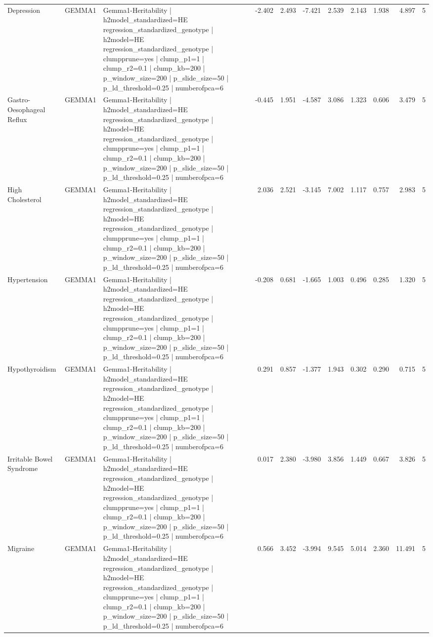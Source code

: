 \begin{landscape}
\begin{longtable}{p{2.4cm}p{1.8cm}p{6.0cm}rrrrrrrr}
Depression & GEMMA1 & Gemma1-Heritability | h2model\_standardized=HE regression\_standardized\_genotype | h2model=HE regression\_standardized\_genotype | clumpprune=yes | clump\_p1=1 | clump\_r2=0.1 | clump\_kb=200 | p\_window\_size=200 | p\_slide\_size=50 | p\_ld\_threshold=0.25 | numberofpca=6 & -2.402 & 2.493 & -7.421 & 2.539 & 2.143 & 1.938 & 4.897 & 5 \\
Gastro-Oesophageal Reflux & GEMMA1 & Gemma1-Heritability | h2model\_standardized=HE regression\_standardized\_genotype | h2model=HE regression\_standardized\_genotype | clumpprune=yes | clump\_p1=1 | clump\_r2=0.1 | clump\_kb=200 | p\_window\_size=200 | p\_slide\_size=50 | p\_ld\_threshold=0.25 | numberofpca=6 & -0.445 & 1.951 & -4.587 & 3.086 & 1.323 & 0.606 & 3.479 & 5 \\
High Cholesterol & GEMMA1 & Gemma1-Heritability | h2model\_standardized=HE regression\_standardized\_genotype | h2model=HE regression\_standardized\_genotype | clumpprune=yes | clump\_p1=1 | clump\_r2=0.1 | clump\_kb=200 | p\_window\_size=200 | p\_slide\_size=50 | p\_ld\_threshold=0.25 | numberofpca=6 & 2.036 & 2.521 & -3.145 & 7.002 & 1.117 & 0.757 & 2.983 & 5 \\
Hypertension & GEMMA1 & Gemma1-Heritability | h2model\_standardized=HE regression\_standardized\_genotype | h2model=HE regression\_standardized\_genotype | clumpprune=yes | clump\_p1=1 | clump\_r2=0.1 | clump\_kb=200 | p\_window\_size=200 | p\_slide\_size=50 | p\_ld\_threshold=0.25 | numberofpca=6 & -0.208 & 0.681 & -1.665 & 1.003 & 0.496 & 0.285 & 1.320 & 5 \\
Hypothyroidism & GEMMA1 & Gemma1-Heritability | h2model\_standardized=HE regression\_standardized\_genotype | h2model=HE regression\_standardized\_genotype | clumpprune=yes | clump\_p1=1 | clump\_r2=0.1 | clump\_kb=200 | p\_window\_size=200 | p\_slide\_size=50 | p\_ld\_threshold=0.25 | numberofpca=6 & 0.291 & 0.857 & -1.377 & 1.943 & 0.302 & 0.290 & 0.715 & 5 \\
Irritable Bowel Syndrome & GEMMA1 & Gemma1-Heritability | h2model\_standardized=HE regression\_standardized\_genotype | h2model=HE regression\_standardized\_genotype | clumpprune=yes | clump\_p1=1 | clump\_r2=0.1 | clump\_kb=200 | p\_window\_size=200 | p\_slide\_size=50 | p\_ld\_threshold=0.25 | numberofpca=6 & 0.017 & 2.380 & -3.980 & 3.856 & 1.449 & 0.667 & 3.826 & 5 \\
Migraine & GEMMA1 & Gemma1-Heritability | h2model\_standardized=HE regression\_standardized\_genotype | h2model=HE regression\_standardized\_genotype | clumpprune=yes | clump\_p1=1 | clump\_r2=0.1 | clump\_kb=200 | p\_window\_size=200 | p\_slide\_size=50 | p\_ld\_threshold=0.25 | numberofpca=6 & 0.566 & 3.452 & -3.994 & 9.545 & 5.014 & 2.360 & 11.491 & 5 \\

\end{longtable}
\end{landscape}
